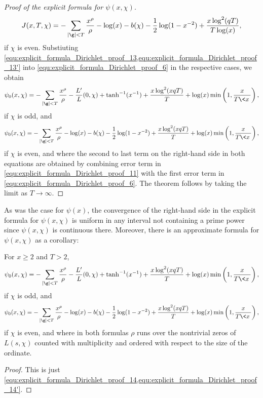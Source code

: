 \begin{proof}[Proof of the explicit formula for $\psi(x,\chi)$]
\begin{equation}
          J(x,T,\chi) = -\sum_{|\g| < T}\frac{x^{\rho}}{\rho}-\log(x)-b(\chi)-\frac{1}{2}\log(1-x^{-2})+\frac{x\log^{2}(qT)}{T\log(x)},
        \end{equation}
        if $\chi$ is even.
        Substiuting \cref{equ:explicit_formula_Dirichlet_proof_13,equ:explicit_formula_Dirichlet_proof_13'} into \cref{equ:explicit_formula_Dirichlet_proof_6} in the respective cases, we obtain
        \begin{equation}\label{equ:explicit_formula_Dirichlet_proof_14}
          \psi_{0}(x,\chi) = -\sum_{|\g| < T}\frac{x^{\rho}}{\rho}-\frac{L'}{L}(0,\chi)+\tanh^{-1}(x^{-1})+\frac{x\log^{2}(xqT)}{T}+\log(x)\min\left(1,\frac{x}{T\<x\>}\right),
        \end{equation}
        if $\chi$ is odd, and
        \begin{equation}\label{equ:explicit_formula_Dirichlet_proof_14'}
          \psi_{0}(x,\chi) = -\sum_{|\g| < T}\frac{x^{\rho}}{\rho}-\log(x)-b(\chi)-\frac{1}{2}\log(1-x^{-2})+\frac{x\log^{2}(xqT)}{T}+\log(x)\min\left(1,\frac{x}{T\<x\>}\right),
        \end{equation}
        if $\chi$ is even, and where the second to last term on the right-hand side in both equations are obtained by combining error term in \cref{equ:explicit_formula_Dirichlet_proof_11} with the first error term in \cref{equ:explicit_formula_Dirichlet_proof_6}. The theorem follows by taking the limit as $T \to \infty$.
      \end{proof}

      As was the case for $\psi(x)$, the convergence of the right-hand side in the explicit formula for $\psi(x,\chi)$ is uniform in any interval not containing a prime power since $\psi(x,\chi)$ is continuous there. Moreover, there is an approximate formula for $\psi(x,\chi)$ as a corollary:

      \begin{corollary}\label{cor:explicit_formula_Dirichlet_corollary}
         For $x \ge 2$ and $T > 2$,
        \[
          \psi_{0}(x,\chi) = -\sum_{|\g| < T}\frac{x^{\rho}}{\rho}-\frac{L'}{L}(0,\chi)+\tanh^{-1}(x^{-1})+\frac{x\log^{2}(xqT)}{T}+\log(x)\min\left(1,\frac{x}{T\<x\>}\right),
        \]
        if $\chi$ is odd, and
        \[
           \psi_{0}(x,\chi) = -\sum_{|\g| < T}\frac{x^{\rho}}{\rho}-\log(x)-b(\chi)-\frac{1}{2}\log(1-x^{-2})+\frac{x\log^{2}(xqT)}{T}+\log(x)\min\left(1,\frac{x}{T\<x\>}\right),
        \]
        if $\chi$ is even, and where in both formulas $\rho$ runs over the nontrivial zeros of $L(s,\chi)$ counted with multiplicity and ordered with respect to the size of the ordinate.
      \end{corollary}
      \begin{proof}
        This is just \cref{equ:explicit_formula_Dirichlet_proof_14,equ:explicit_formula_Dirichlet_proof_14'}.
      \end{proof}

